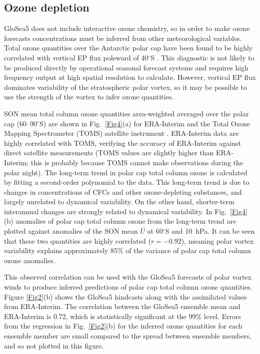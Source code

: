 \subsection{Ozone depletion}

GloSea5 does not include interactive ozone chemistry, so in order to make ozone forecasts concentrations must be inferred from other meteorological variables. Total ozone quantities over the Antarctic polar cap have been found to be highly correlated with vertical EP flux poleward of 40$^{\circ}$S \citep{Weber2011, Salby2012}. This diagnostic is not likely to be produced directly by operational seasonal forecast systems and requires high frequency output at high spatial resolution to calculate. However, vertical EP flux dominates variability of the stratospheric polar vortex, so it may be possible to use the strength of the vortex to infer ozone quantities. 

SON mean total column ozone quantities area-weighted averaged over the polar cap (60--90$^{\circ}$S) are shown in Fig.\ \ref{Fig4}(a) for ERA-Interim and the Total Ozone Mapping Spectrometer (TOMS) satellite instrument \citep{Kroon2008}. ERA-Interim data are highly correlated with TOMS, verifying the accuracy of ERA-Interim against direct satellite measurements (TOMS values are slightly higher than ERA-Interim; this is probably because TOMS cannot make observations during the polar night). The long-term trend in polar cap total column ozone is calculated by fitting a second-order polynomial to the data. This long-term trend is due to changes in concentrations of CFCs and other ozone-depleting substances, and largely unrelated to dynamical variability. On the other hand, shorter-term interannual changes are strongly related to dynamical variability. In Fig.\ \ref{Fig4}(b) anomalies of polar cap total column ozone from the long-term trend are plotted against anomalies of the SON mean $\overline{U}$ at 60$^{\circ}$S and 10~hPa. It can be seen that these two quantities are highly correlated ($r=-0.92$), meaning polar vortex variability explains approximately 85\% of the variance of polar cap total column ozone anomalies.

This observed correlation can be used with the GloSea5 forecasts of polar vortex winds to produce inferred predictions of polar cap total column ozone quantities. Figure \ref{Fig2}(b) shows the GloSea5 hindcasts along with the assimilated values from ERA-Interim. The correlation between the GloSea5 ensemble mean and ERA-Interim is 0.72, which is statistically significant at the 99\% level. Errors from the regression in Fig.\ \ref{Fig2}(b) for the inferred ozone quantities for each ensemble member are small compared to the spread between ensemble members, and so not plotted in this figure.

